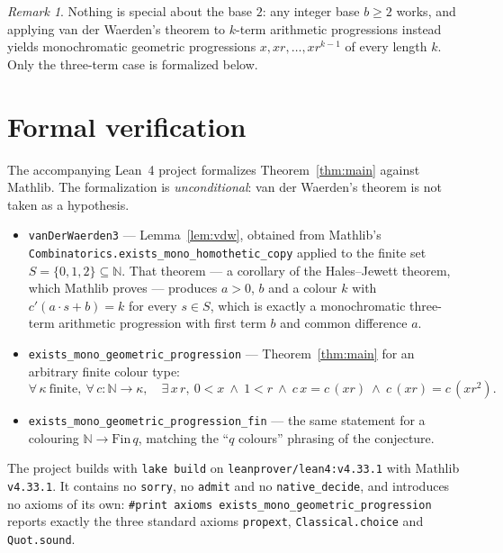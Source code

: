 \documentclass[11pt]{article}
\theoremstyle{plain}
\theoremstyle{remark}
\newtheorem{remark}[theorem]{Remark}
\begin{document}
\begin{remark}
Nothing is special about the base $2$: any integer base $b\ge2$ works, and
applying van der Waerden's theorem to $k$-term arithmetic progressions instead
yields monochromatic geometric progressions $x,xr,\ldots,xr^{k-1}$ of every
length $k$. Only the three-term case is formalized below.
\end{remark}

\section{Formal verification}

The accompanying Lean~4 project formalizes Theorem~\ref{thm:main} against
Mathlib. The formalization is \emph{unconditional}: van der Waerden's theorem
is not taken as a hypothesis.

\begin{itemize}
  \item \texttt{vanDerWaerden3} --- Lemma~\ref{lem:vdw}, obtained from Mathlib's
    \texttt{Combinatorics.exists\_mono\_homothetic\_copy} applied to the finite
    set $S=\{0,1,2\}\subseteq\mathbb N$. That theorem --- a corollary of the
    Hales--Jewett theorem, which Mathlib proves --- produces $a>0$, $b$ and a
    colour $k$ with $c'(a\cdot s+b)=k$ for every $s\in S$, which is exactly a
    monochromatic three-term arithmetic progression with first term $b$ and
    common difference $a$.
  \item \texttt{exists\_mono\_geometric\_progression} ---
    Theorem~\ref{thm:main} for an arbitrary finite colour type:
    \[
      \forall\,\kappa\ \text{finite},\ \forall\,c:\mathbb N\to\kappa,\quad
      \exists\,x\,r,\ 0<x\ \wedge\ 1<r\ \wedge\
      c\,x=c\,(xr)\ \wedge\ c\,(xr)=c\,(xr^2).
    \]
  \item \texttt{exists\_mono\_geometric\_progression\_fin} --- the same
    statement for a colouring $\mathbb N\to\mathrm{Fin}\,q$, matching the
    ``$q$ colours'' phrasing of the conjecture.
\end{itemize}

The project builds with \texttt{lake build} on
\texttt{leanprover/lean4:v4.33.1} with Mathlib \texttt{v4.33.1}. It contains no
\texttt{sorry}, no \texttt{admit} and no \texttt{native\_decide}, and
introduces no axioms of its own:
\texttt{\#print axioms exists\_mono\_geometric\_progression} reports exactly the
three standard axioms \texttt{propext}, \texttt{Classical.choice} and
\texttt{Quot.sound}.
\end{document}
